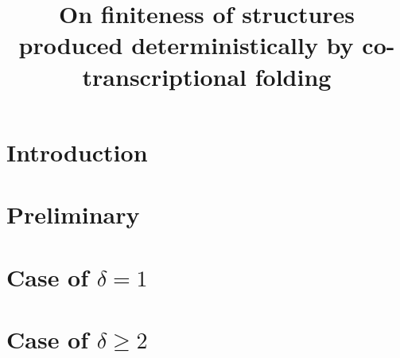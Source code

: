 \documentclass[runningheads]{llncs}
\title{On finiteness of structures produced deterministically by co-transcriptional folding}
\author{}
\date{}
\begin{document}
\maketitle

\section{Introduction}


\section{Preliminary}


\section{Case of $\delta = 1$}


\section{Case of $\delta \geq 2$}


  
\end{document}
